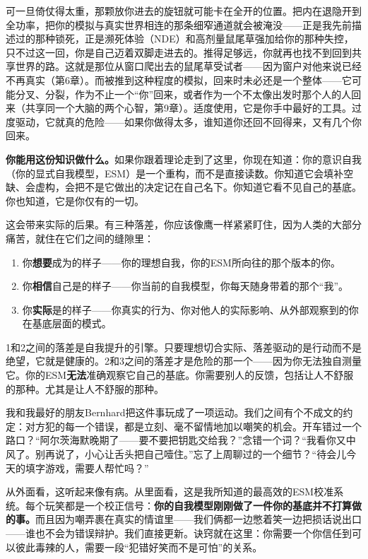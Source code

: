 \documentclass[11pt, twoside, openright]{book}
\begin{document}
可一旦倚仗得太重，那颗放你进去的旋钮就可能卡在全开的位置。把内在退隐开到全功率，把你的模拟与真实世界相连的那条细窄通道就会被淹没------正是我先前描述过的那种锁死，正是濒死体验（NDE）和高剂量鼠尾草强加给你的那种失控，只不过这一回，你是自己迈着双脚走进去的。推得足够远，你就再也找不到回到共享世界的路。这就是那位从窗口爬出去的鼠尾草受试者------因为窗户对他来说已经不再真实（第6章）。而被推到这种程度的模拟，回来时未必还是一个整体------它可能分叉、分裂，作为不止一个“你”回来，或者作为一个不太像出发时那个人的人回来（共享同一个大脑的两个心智，第9章）。适度使用，它是你手中最好的工具。过度驱动，它就真的危险------如果你做得太多，谁知道你还回不回得来，又有几个你回来。

\textbf{你能用这份知识做什么。}如果你跟着理论走到了这里，你现在知道：你的意识自我（你的显式自我模型，ESM）是一个重构，而不是直接读数。你知道它会填补空缺、会虚构，会把不是它做出的决定记在自己名下。你知道它看不见自己的基底。你也知道，它是你仅有的一切。

这会带来实际的后果。有三种落差，你应该像鹰一样紧紧盯住，因为人类的大部分痛苦，就住在它们之间的缝隙里：

\begin{enumerate}
  \item 你\textbf{想要}成为的样子------你的理想自我，你的ESM所向往的那个版本的你。
  \item 你\textbf{相信}自己是的样子------你当前的自我模型，你每天随身带着的那个“我”。
  \item 你\textbf{实际}是的样子------你真实的行为、你对他人的实际影响、从外部观察到的你在基底层面的模式。
\end{enumerate}

1和2之间的落差是自我提升的引擎。只要理想切合实际、落差驱动的是行动而不是绝望，它就是健康的。2和3之间的落差才是危险的那一个------因为你无法独自测量它。你的ESM\textbf{无法}准确观察它自己的基底。你需要别人的反馈，包括让人不舒服的那种。尤其是让人不舒服的那种。

我和我最好的朋友Bernhard把这件事玩成了一项运动。我们之间有个不成文的约定：对方犯的每一个错误，都是立刻、毫不留情地加以嘲笑的机会。开车错过一个路口？“阿尔茨海默晚期了------要不要把钥匙交给我？”念错一个词？“我看你又中风了。别再说了，小心让舌头把自己噎住。”忘了上周聊过的一个细节？“待会儿今天的填字游戏，需要人帮忙吗？”

从外面看，这听起来像有病。从里面看，这是我所知道的最高效的ESM校准系统。每个玩笑都是一个校正信号：\textbf{你的自我模型刚刚做了一件你的基底并不打算做的事。}而且因为嘲弄裹在真实的情谊里------我们俩都一边憋着笑一边把损话说出口------谁也不会为错误辩护。我们直接更新。诀窍就在这里：你需要一个你信任到可以彼此毒辣的人，需要一段“犯错好笑而不是可怕”的关系。
\end{document}
